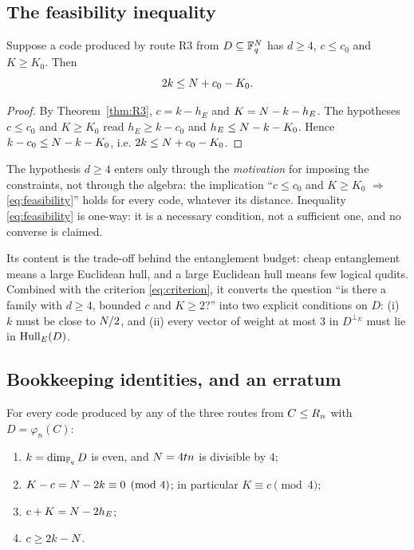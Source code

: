 \subsection{The feasibility inequality}

\begin{theorem}\label{thm:feasibility}
Suppose a code produced by route R3 from $D\subseteq\mathbb F_q^{N}$ has
$d\ge4$, $c\le c_0$ and $K\ge K_0$. Then
\begin{equation}\label{eq:feasibility}
  2k\le N+c_0-K_0 .
\end{equation}
\end{theorem}

\begin{proof}
By Theorem~\ref{thm:R3}, $c=k-h_E$ and $K=N-k-h_E$. The hypotheses
$c\le c_0$ and $K\ge K_0$ read $h_E\ge k-c_0$ and
$h_E\le N-k-K_0$. Hence $k-c_0\le N-k-K_0$, i.e.
$2k\le N+c_0-K_0$.
\end{proof}

\begin{remark}
The hypothesis $d\ge4$ enters only through the \emph{motivation} for imposing
the constraints, not through the algebra: the implication
``$c\le c_0$ and $K\ge K_0$ $\Rightarrow$ \eqref{eq:feasibility}'' holds for
every code, whatever its distance. Inequality \eqref{eq:feasibility} is one-way:
it is a necessary condition, not a sufficient one, and no converse is claimed.

Its content is the trade-off behind the entanglement budget: cheap entanglement
means a large Euclidean hull, and a large Euclidean hull means few logical
qudits. Combined with the criterion \eqref{eq:criterion}, it converts the
question ``is there a family with $d\ge4$, bounded $c$ and $K\ge2$?'' into two
explicit conditions on $D$: (i) $k$ must be close to $N/2$, and (ii) every
vector of weight at most $3$ in $D^{\perp_E}$ must lie in $\operatorname{Hull}_E(D)$.
\end{remark}

\subsection{Bookkeeping identities, and an erratum}

\begin{theorem}[bookkeeping]\label{thm:bookkeeping}
For every code produced by any of the three routes from $C\le R_n$ with
$D=\varphi_n(C)$:
\begin{enumerate}[label=\textnormal{(\alph*)},leftmargin=*]
\item $k=\dim_{\mathbb F_q}D$ is even, and $N=4tn$ is divisible by $4$;
\item $K-c=N-2k\equiv0\pmod4$; in particular $K\equiv c\pmod4$;
\item $c+K=N-2h_E$;
\item $c\ge 2k-N$.
\end{enumerate}
\end{theorem}

